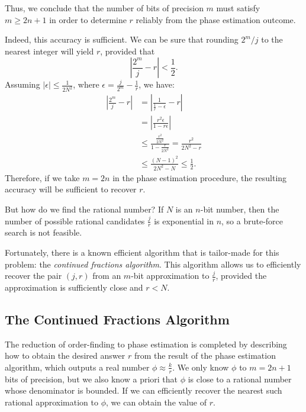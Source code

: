 Thus, we conclude that the number of bits of precision $m$ must satisfy $m \geq 2n + 1$ in order to determine $r$ reliably from the phase estimation outcome.

Indeed, this accuracy is sufficient. We can be sure that rounding $2^m / j$ to the nearest integer will yield $r$, provided that
\[
\left| \frac{2^m}{j} - r \right| < \frac{1}{2}.
\]
Assuming $|\epsilon| \leq \frac{1}{2N^2}$, where $\epsilon = \frac{j}{2^m} - \frac{1}{r}$, we have:
\begin{align*}
\left| \frac{2^m}{j} - r \right| &= \left| \frac{1}{\frac{1}{r} - \epsilon} - r \right| \\
&= \left| \frac{r^2 \epsilon}{1 - r\epsilon} \right| \\
&\leq \frac{\frac{r^2}{2N^2}}{1 - \frac{r}{2N^2}} = \frac{r^2}{2N^2 - r} \\
&\leq \frac{(N - 1)^2}{2N^2 - N} \leq \frac{1}{2}.
\end{align*}
Therefore, if we take $m = 2n$ in the phase estimation procedure, the resulting accuracy will be sufficient to recover $r$.

\vspace{0.5em}

But how do we find the rational number? If $N$ is an $n$-bit number, then the number of possible rational candidates $\frac{j}{r}$ is exponential in $n$, so a brute-force search is not feasible.

Fortunately, there is a known efficient algorithm that is tailor-made for this problem: the \textit{continued fractions algorithm}. This algorithm allows us to efficiently recover the pair $(j, r)$ from an $m$-bit approximation to $\frac{j}{r}$, provided the approximation is sufficiently close and $r < N$.

\subsection{The Continued Fractions Algorithm}

The reduction of order-finding to phase estimation is completed by describing how to obtain the desired answer $r$ from the result of the phase estimation algorithm, which outputs a real number $\phi \approx \frac{k}{r}$. We only know $\phi$ to $m = 2n + 1$ bits of precision, but we also know a priori that $\phi$ is close to a rational number whose denominator is bounded. If we can efficiently recover the nearest such rational approximation to $\phi$, we can obtain the value of $r$.

